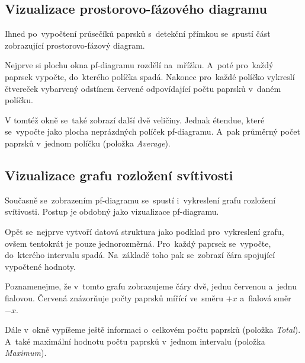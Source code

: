 \beautypage

\subsection{Vizualizace prostorovo-fázového diagramu}

Ihned po~vypočtení průsečíků paprsků s~detekční přímkou se~spustí část zobrazující prostorovo-fázový diagram.

Nejprve si plochu okna pf-diagramu rozdělí na~mřížku. A~poté pro~každý paprsek vypočte, do~kterého políčka spadá. Nakonec pro~každé políčko vykreslí čtvereček vybarvený odstínem červené odpovídající počtu paprsků v~daném políčku.

V tomtéž okně se~také zobrazí další dvě veličiny. Jednak étendue, které se~vypočte jako plocha neprázdných políček pf-diagramu. A~pak průměrný počet paprsků v~jednom políčku (položka \emph{Average}).


\subsection{Vizualizace grafu rozložení svítivosti}

Současně se~zobrazením pf-diagramu se~spustí i~vykreslení grafu rozložení svítivosti. Postup je obdobný jako vizualizace pf-diagramu.

Opět se~nejprve vytvoří datová struktura jako podklad pro~vykreslení grafu, ovšem tentokrát je pouze jednorozměrná. Pro~každý paprsek se~vypočte, do~kterého intervalu spadá. Na~základě toho pak se~zobrazí čára spojující vypočtené hodnoty.

Poznamenejme, že v~tomto grafu zobrazujeme čáry dvě, jednu červenou a~jednu fialovou. Červená znázorňuje počty paprsků mířící ve~směru $+x$ a~fialová směr $-x$.

Dále v~okně vypíšeme ještě informaci o~celkovém počtu paprsků (položka \emph{Total}). A~také maximální hodnotu počtu paprsků v~jednom intervalu (položka \emph{Maximum}).

